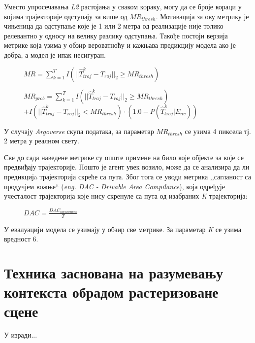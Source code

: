 \documentclass[11pt,oneside]{memoir}
\begin{document}
Уместо упросечавања \textit{L2} растојања у сваком кораку, могу да се броје кораци у којима трајекторије одступају за више од $MR_{thresh}$. 
Мотивација за ову метрику је чињеница да одступање које је 1 или 2 метра од реализације није толико релевантно у односу на 
велику разлику одступања. \cite{home} Такође постоји верзија метрике која узима у обзир вероватноћу и кажњава предикцију 
модела ако је добра, а модел је ипак несигуран.

\begin{figure}[h!]
  \centering
  $MR = \sum^T_{k=1} I(||\hat{T}^{k}_{traj} - T_{raj}||_{2} \geq MR_{thresh})$
\end{figure}

\begin{figure}[h!]
  \centering
  $MR_{prob} = \sum^T_{k=1} I(||\hat{T}^{k}_{traj} - T_{raj}||_{2} \geq MR_{thresh}) $
  $+ I(||\hat{T}^{k}_{traj} - T_{raj}||_{2} < MR_{thresh}) \cdot (1.0 - P(\hat{T}^{k}_{traj}|E_{nv}))$
\end{figure}

\noindent У случају \textit{Argoverse} скупа података, за параметар $MR_{thresh}$ се узима 4 пиксела тј. 2 метра у реалном свету. 

Све до сада наведене метрике су опште примене на било које објекте за које се предвиђају трајекторије. Пошто је агент увек возило, може да
се анализира да ли предикцијa трајекторија скреће са пута. Због тога се уводи метрика ,,сагланост са продучјем вожње`` 
(\textit{eng. DAC - Drivable Area Compilance}), која одређује учесталост трајекторија које нису скренуле са пута од изабраних 
\textit{K} трајекторија: \cite{argoverse}

\begin{figure}[h!]
  \centering
  $DAC = \frac{DAC_{occurences}}{T}$
\end{figure}

У евалуацији модела се узимају у обзир све метрике. За параметар \textit{K} се узима вредност 6.

\chapter{Техника заснована на разумевању контекста обрадом растеризоване сцене}
\label{chp:razrada}

У изради...

\end{document}
